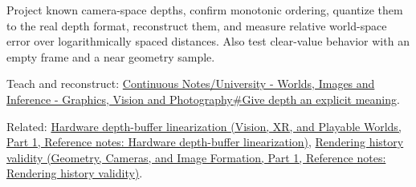 \hypertarget{appendix-275ec8847057-tests}{}

Project known camera-space depths, confirm monotonic ordering, quantize them to the real depth format, reconstruct them, and measure relative world-space error over logarithmically spaced distances. Also test clear-value behavior with an empty frame and a near geometry sample.

Teach and reconstruct: \hyperref[03-visual-computing-i-ch012-give-depth-an-explicit-meaning]{Continuous Notes/University - Worlds, Images and Inference - Graphics, Vision and Photography\#Give depth an explicit meaning}.

Related: \href{../07-Vision-XR-and-Playable-Worlds-P01/main.pdf\#nameddest=appendix-1bc40b08db4a}{Hardware depth-buffer linearization (Vision, XR, and Playable Worlds, Part 1, Reference notes: Hardware depth-buffer linearization)}, \href{../03-Geometry-Cameras-and-Image-Formation-P01/main.pdf\#nameddest=appendix-2e7e9fd28a2c}{Rendering history validity (Geometry, Cameras, and Image Formation, Part 1, Reference notes: Rendering history validity)}.
